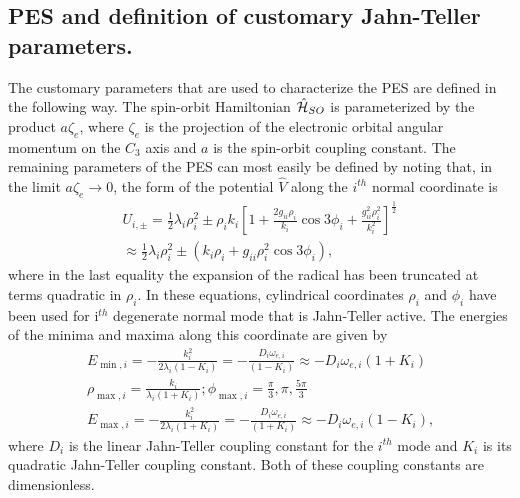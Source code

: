 \documentclass{article}
\begin{document}
\subsection{PES and definition of customary Jahn-Teller parameters.} 
The customary parameters that are used to characterize the 
PES are defined in the following way. The spin-orbit 
Hamiltonian $\hat{\cal H}_{SO}$ is parameterized by the product $a\zeta _e$,
where $\zeta _e$ is the projection of the electronic orbital angular
momentum on the $C_3$ axis and $a$ is the spin-orbit coupling constant.
The remaining parameters of the PES can most easily be defined by noting 
that, in the limit $a\zeta _e\rightarrow 0$, the form of the potential
$\hat{V}$ along the $i^{th}$ normal coordinate is
\begin{eqnarray}
  &U_{i,\pm }= \frac12 \lambda _i \rho _i^2 \pm \rho _i k_i
   \left[ 1 + \frac{2g_{ii}\rho _i}{k_i}\cos 3\phi _i + 
   \frac{g_{ii}^2\rho _i^2}{k_i^2} \right]^{\frac12} &\\
  &\approx \frac12 \lambda _i \rho _i^2 \pm \left( k_i \rho _i + 
  g_{ii}\rho _i^2 \cos 3\phi _i \right) ,& 
\label{U, no spin orbit}
\end{eqnarray}
where in the last equality the expansion of the radical has been
truncated at terms quadratic in $\rho _i$. In these equations, cylindrical 
coordinates $\rho _i$ and $\phi _i$ have been used for i$^{th}$ degenerate
normal mode that is Jahn-Teller active. 
The energies of the minima and maxima along this coordinate are given by
\begin{eqnarray}
&E_{\min ,i} =-\frac{k_{i}^{2}}{2\lambda _{i}(1-K_{i})}=-\frac{D_{i}\omega
_{e,i}}{(1-K_{i})}\approx -D_{i}\omega _{e,i}(1+K_{i})&
\label{E min, no spin orbit} \\
&\rho _{\max ,i} =\frac{k_{i}}{\lambda _{i}(1+K_{i})};
\phi _{\max ,i} = \frac{\pi }{3}, \pi , \frac{5\pi}{3}&
\label{rho max, no spin orbit} \\
&E_{\max ,i} =-\frac{k_{i}^{2}}{2\lambda _{i}(1+K_{i})}=-\frac{D_{i}\omega
_{e,i}}{(1+K_{i})}\approx -D_{i}\omega _{e,i}(1-K_{i})\text{,}&
\label{E max, no spin orbit}
\end{eqnarray}
where $D_{i}$ is the linear Jahn-Teller coupling constant for the $i^{th}$ 
mode and $K_{i}$ is its quadratic Jahn-Teller coupling constant. Both 
of these coupling constants are dimensionless.
\end{document}
